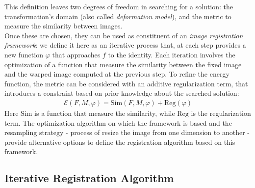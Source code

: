 \noindent
This definition leaves two degrees of freedom in searching for a solution: the transformation's domain (also called \emph{deformation model}), and the metric to measure the similarity between images. \\
Once these are chosen, they can be used as constituent of an \emph{image registration framework}: we define it here as an iterative process that, at each step provides a new function $\varphi$ that approaches $f$ to the identity.
Each iteration involves the optimization of a function that measure the similarity between the fixed image and the warped image computed at the previous step. To refine the energy function, the metric can be considered with an additive regularization term, that introduces a constraint based on prior knowledge about the searched solution:
\begin{align}\label{eq:general_cost_function}
\mathcal{E}(F, M, \varphi) = \text{Sim}(F,M,\varphi) + \text{Reg}(\varphi) 
\end{align}
Here $\text{Sim}$ is a function that measure the similarity, while $\text{Reg}$ is the regularization term.
The optimization algorithm on which the framework is based and the resampling strategy - process of resize the image from one dimension to another - provide alternative options to define the registration algorithm based on this framework.

\subsection{Iterative Registration Algorithm}

